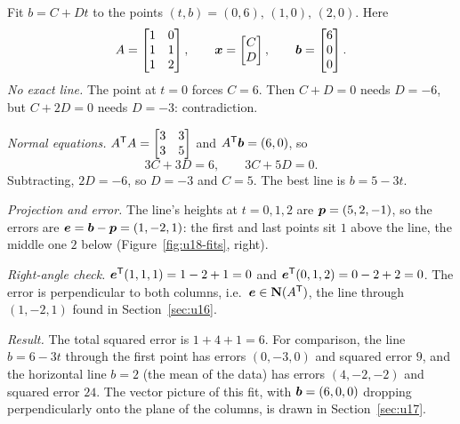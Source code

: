 \begin{example}\label{ex:u18-short}
Fit $b=C+Dt$ to the points $(t,b)=(0,6),\,(1,0),\,(2,0)$. Here
\[
  A=\begin{bmatrix}1&0\\1&1\\1&2\end{bmatrix},\qquad
  \boldsymbol{x}=\begin{bmatrix}C\\D\end{bmatrix},\qquad
  \boldsymbol{b}=\begin{bmatrix}6\\0\\0\end{bmatrix}.
\]
\emph{No exact line.} The point at $t=0$ forces $C=6$. Then $C+D=0$ needs $D=-6$, but
$C+2D=0$ needs $D=-3$: contradiction.

\emph{Normal equations.}
$A^{\mathsf{T}} A=\begin{bmatrix}3&3\\3&5\end{bmatrix}$ and $A^{\mathsf{T}}\boldsymbol{b}=(6,0)$, so
\[
  3C+3D=6,\qquad 3C+5D=0 .
\]
Subtracting, $2D=-6$, so $D=-3$ and $C=5$. The best line is $b=5-3t$.

\emph{Projection and error.} The line's heights at $t=0,1,2$ are $\boldsymbol{p}=(5,2,-1)$, so the
errors are $\boldsymbol{e}=\boldsymbol{b}-\boldsymbol{p}=(1,-2,1)$: the first and last points sit $1$ above the line,
the middle one $2$ below (Figure~\ref{fig:u18-fits}, right).

\emph{Right-angle check.} $\boldsymbol{e}^{\mathsf{T}}(1,1,1)=1-2+1=0$ and $\boldsymbol{e}^{\mathsf{T}}(0,1,2)=0-2+2=0$. The error
is perpendicular to both columns, i.e.\ $\boldsymbol{e}\in\mathbf{N}(A^{\mathsf{T}})$, the line through $(1,-2,1)$ found
in Section~\ref{sec:u16}.

\emph{Result.} The total squared error is $1+4+1=6$. For comparison, the line $b=6-3t$
through the first point has errors $(0,-3,0)$ and squared error $9$, and the horizontal line
$b=2$ (the mean of the data) has errors $(4,-2,-2)$ and squared error $24$. The vector
picture of this fit, with $\boldsymbol{b}=(6,0,0)$ dropping perpendicularly onto the plane of the
columns, is drawn in Section~\ref{sec:u17}.
\end{example}

